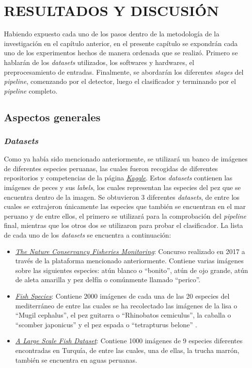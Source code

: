 \chapter{RESULTADOS Y DISCUSI\'ON}

Habiendo expuesto cada uno de los pasos dentro de la metodología de la investigación en el capítulo anterior, 
en el presente capítulo se expondrán cada uno de los experimentos hechos de manera ordenada 
que se realizó. Primero se hablarán de los \textit{datasets} utilizados, los softwares y 
hardwares, el preprocesamiento de entradas. Finalmente, se abordarán los diferentes 
\textit{stages} del \textit{pipeline}, comenzando por el detector, luego el clasificador y 
terminando por el \textit{pipeline} completo.

\section{Aspectos generales}
\subsection{\textit{Datasets}}
Como ya había sido mencionado anteriormente, se utilizará un banco de imágenes de diferentes especies peruanas, las cuales fueron recogidas de  diferentes repositorios y competencias de la página \href{https://www.kaggle.com/}{\textit{Kaggle}}. Estos \textit{datasets}  contienen las imágenes de peces y sus \textit{labels}, los cuales representan las especies del pez que se encuentra dentro de la imagen. Se obtuvieron 3 diferentes \textit{datasets}, de entre los cuales se extrajeron únicamente las especies que también se encuentran en el mar peruano y de entre ellos, el primero se utilizará para la comprobación del \textit{pipeline} final, mientras que los otros dos se utilizaron para probar el clasificador. La lista de cada uno de los \textit{datasets} se encuentra a continuación:
\begin{itemize}
    \item \href{https://www.kaggle.com/c/the-nature-conservancy-fisheries-monitoring}{\textit{The Nature Conservancy Fisheries Monitoring}}: Concurso realizado en 2017 a través de la plataforma mencionado anteriormente. Contiene varias imágenes sobre las siguientes especies: atún blanco o ``bonito'', atún de ojo grande, atún de aleta amarilla y pez delfín o comúnmente llamado ``perico''.
    \item \href{https://www.kaggle.com/datasets/giannisgeorgiou/fish-species}{\textit{Fish Species}}: Contiene 2000 imágenes de cada una de las 20 especies del mediterráneo de entre las cuales se ha recolectado las imágenes de la lisa o ``Mugil cephalus'', el pez guitarra o ``Rhinobatos cemiculus'', la caballa o ``scomber japonicus'' y el pez espada o ``tetrapturus belone'' . 
    \item \href{https://www.kaggle.com/datasets/crowww/a-large-scale-fish-dataset}{\textit{A Large Scale Fish Dataset}}: Contiene 1000 imágenes de 9 especies diferentes encontradas en Turquía, de entre las cuales, una de ellas, la trucha marrón, también se encuentra en aguas peruanas. 
\end{itemize}


